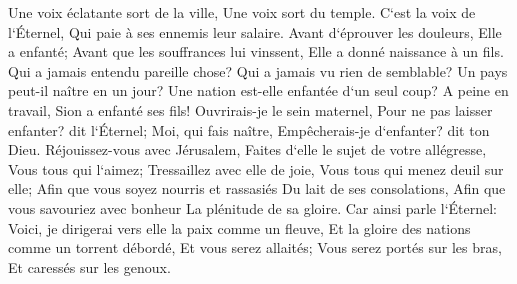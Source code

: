 \verse Une voix éclatante sort de la ville, Une voix sort du temple. C`est la voix de l`Éternel, Qui paie à ses ennemis leur salaire. 
\verse Avant d`éprouver les douleurs, Elle a enfanté; Avant que les souffrances lui vinssent, Elle a donné naissance à un fils. 
\verse Qui a jamais entendu pareille chose? Qui a jamais vu rien de semblable? Un pays peut-il naître en un jour? Une nation est-elle enfantée d`un seul coup? A peine en travail, Sion a enfanté ses fils! 
\verse Ouvrirais-je le sein maternel, Pour ne pas laisser enfanter? dit l`Éternel; Moi, qui fais naître, Empêcherais-je d`enfanter? dit ton Dieu. 
\verse Réjouissez-vous avec Jérusalem, Faites d`elle le sujet de votre allégresse, Vous tous qui l`aimez; Tressaillez avec elle de joie, Vous tous qui menez deuil sur elle; 
\verse Afin que vous soyez nourris et rassasiés Du lait de ses consolations, Afin que vous savouriez avec bonheur La plénitude de sa gloire. 
\verse Car ainsi parle l`Éternel: Voici, je dirigerai vers elle la paix comme un fleuve, Et la gloire des nations comme un torrent débordé, Et vous serez allaités; Vous serez portés sur les bras, Et caressés sur les genoux. 
